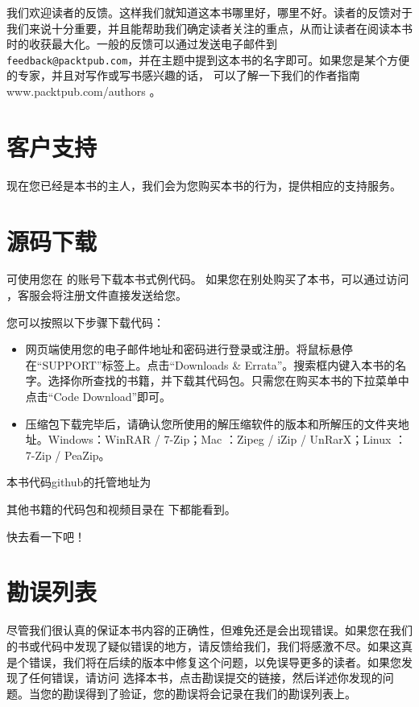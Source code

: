 我们欢迎读者的反馈。这样我们就知道这本书哪里好，哪里不好。读者的反馈对于我们来说十分重要，并且能帮助我们确定读者关注的重点，从而让读者在阅读本书时的收获最大化。一般的反馈可以通过发送电子邮件到 \texttt{feedback@packtpub.com}，并在主题中提到这本书的名字即可。如果您是某个方便的专家，并且对写作或写书感兴趣的话， 可以了解一下我们的作者指南www.packtpub.com/authors 。

\section{客户支持}

现在您已经是本书的主人，我们会为您购买本书的行为，提供相应的支持服务。

\section{源码下载}

可使用您在  的账号下载本书式例代码。 如果您在别处购买了本书，可以通过访问  ，客服会将注册文件直接发送给您。

您可以按照以下步骤下载代码：

\begin{itemize}
\item 网页端使用您的电子邮件地址和密码进行登录或注册。将鼠标悬停在“SUPPORT”标签上。点击“Downloads \& Errata”。搜索框内键入本书的名字。选择你所查找的书籍，并下载其代码包。只需您在购买本书的下拉菜单中点击“Code Download”即可。

\item 压缩包下载完毕后，请确认您所使用的解压缩软件的版本和所解压的文件夹地址。Windows：WinRAR / 7-Zip；Mac ：Zipeg / iZip / UnRarX；Linux ：7-Zip / PeaZip。

\end{itemize}

本书代码github的托管地址为 

其他书籍的代码包和视频目录在  下都能看到。

快去看一下吧！

\section{勘误列表}

尽管我们很认真的保证本书内容的正确性，但难免还是会出现错误。如果您在我们的书或代码中发现了疑似错误的地方，请反馈给我们，我们将感激不尽。如果这真是个错误，我们将在后续的版本中修复这个问题，以免误导更多的读者。如果您发现了任何错误，请访问  选择本书，点击勘误提交的链接，然后详述你发现的问题。当您的勘误得到了验证，您的勘误将会记录在我们的勘误列表上。

